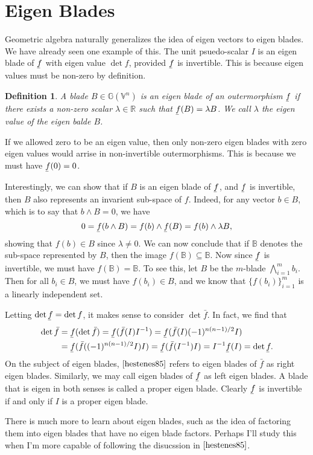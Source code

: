 \documentclass[12pt]{article}
\newcommand{\G}{\mathbb{G}}
\newcommand{\V}{\mathbb{V}}
\newcommand{\R}{\mathbb{R}}
\newcommand{\B}{\mathbb{B}}
\newcommand{\uf}{\underaccent{\bar}{f}}
\newcommand{\of}{\bar{f}}
\newtheorem{definition}{Definition}[section]
\begin{document}
\section{Eigen Blades}

Geometric algebra naturally generalizes the idea of eigen vectors to eigen blades.  We have already
seen one example of this.  The unit psuedo-scalar $I$ is an eigen blade of $\uf$ with eigen value $\det f$,
provided $\uf$ is invertible.  This is because eigen values must be non-zero by definition.
\begin{definition}
A blade $B\in\G(\V^n)$ is an eigen blade of an outermorphism $\uf$ if there exists a non-zero scalar $\lambda\in\R$
such that $\uf(B)=\lambda B$.  We call $\lambda$ the eigen value of the eigen balde $B$.
\end{definition}
If we allowed zero to be an eigen value, then only non-zero eigen blades with zero eigen values
would arrise in non-invertible outermorphisms.  This is because we must have $\uf(0)=0$.

Interestingly, we can show that if $B$ is an eigen blade of $\uf$, and $\uf$ is invertible, then $B$ also represents
an invarient sub-space of $f$.  Indeed, for any vector $b\in B$, which is to say that $b\wedge B=0$, we have
\begin{equation*}
0 = \uf(b\wedge B) = f(b)\wedge\uf(B) = f(b)\wedge \lambda B,
\end{equation*}
showing that $f(b)\in B$ since $\lambda\neq 0$.  We can now conclude that if $\B$ denotes the sub-space represented
by $B$, then the image $f(\B)\subseteq \B$.  Now since $\uf$ is invertible, we must have $f(\B)=\B$.
To see this, let $B$ be the $m$-blade $\bigwedge_{i=1}^m b_i$.  Then for all $b_i\in B$, we
must have $f(b_i)\in B$, and we know that $\{f(b_i)\}_{i=1}^m$ is a linearly independent set.

Letting $\det\uf=\det f$, it makes sense to consider $\det\of$.  In fact, we find that
\begin{align*}
\det\of &= \uf(\det\of) = \uf(\of(I) I^{-1}) = \uf(\of(I)(-1)^{n(n-1)/2}I) \\
 &= \uf(\of((-1)^{n(n-1)/2}I) I) = \uf(\of(I^{-1}) I) = I^{-1}\uf(I) = \det\uf.
\end{align*}
On the subject of eigen blades, $\cite{hestenes85}$ refers to eigen blades of $\of$ as right eigen blades.
Similarly, we may call eigen blades of $\uf$ as left eigen blades.  A blade that is eigen in both senses
is called a proper eigen blade.  Clearly $\uf$ is invertible if and only if $I$ is a proper eigen blade.

There is much more to learn about eigen blades, such as the idea of factoring them into
eigen blades that have no eigen blade factors.  Perhaps I'll study this when I'm more capable
of following the disucssion in $\cite{hestenes85}$.




\end{document}
